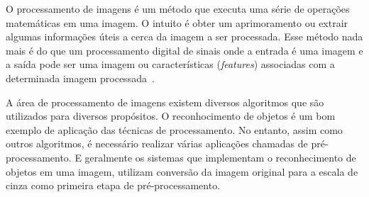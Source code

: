 O processamento de imagens é um método que executa uma série de operações
matemáticas em uma imagem. O intuito é obter um aprimoramento ou extrair algumas
informações úteis a cerca da imagem a ser processada. Esse método nada mais é do
que um processamento digital de sinais onde a entrada é uma imagem e a saída
pode ser uma imagem ou características (\textit{features}) associadas com a
determinada imagem processada~\cite{Tartu19}.

A área de processamento de imagens existem diversos algoritmos que são
utilizados para diversos propósitos. O reconhocimento de objetos é um bom
exemplo de aplicação das técnicas de processamento. No entanto, assim como
outros algoritmos, é necessário realizar várias aplicações chamadas de
pré-processamento. E geralmente os sistemas que implementam o reconhecimento de
objetos em uma imagem, utilizam conversão da imagem original para a escala de
cinza como primeira etapa de pré-processamento.

